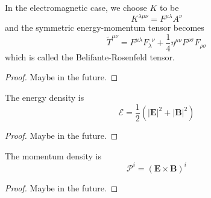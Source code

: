     In the electromagnetic case, we choose $K$ to be 
    \begin{equation*}
        K^{\lambda\mu\nu} = F^{\mu\lambda} A^\nu
    \end{equation*}
    and the symmetric energy-momentum tensor becomes 
    \begin{equation*}
        \tilde T^{\mu\nu} = F^{\mu\lambda} F_{\lambda}^{\phantom \lambda \nu} + \frac{1}{4} \eta^{\mu\nu} F^{\rho\sigma} F_{\rho\sigma}
    \end{equation*}
    which is called the Belifante-Rosenfeld tensor.

    \begin{proof}
        Maybe in the future.
    \end{proof}

    The energy density is 
    \begin{equation*}
        \mathcal E = \frac{1}{2} (|\mathbf E|^2 + |\mathbf B|^2)
    \end{equation*}

    \begin{proof}
        Maybe in the future.
    \end{proof}

    The momentum density is 
    \begin{equation*}
        \mathcal P^i = (\mathbf E \times \mathbf B)^i
    \end{equation*}

    \begin{proof}
        Maybe in the future.
    \end{proof}

